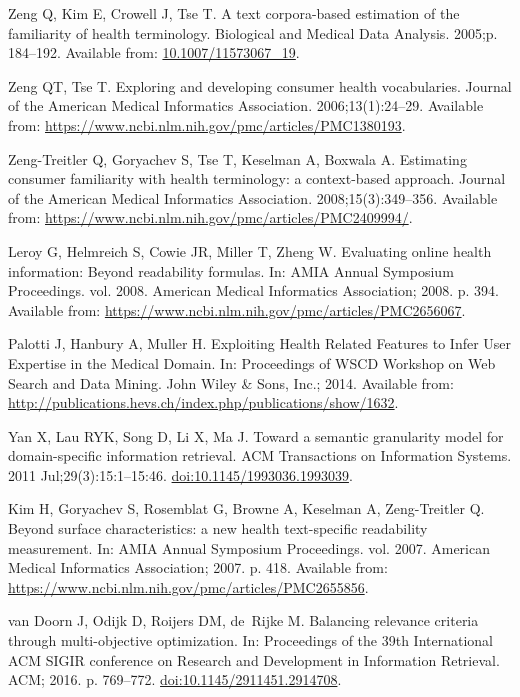 \documentclass[10pt,a4paper]{article}
\begin{document}
\begin{thebibliography}{10}
	Zeng Q, Kim E, Crowell J, Tse T.
	\newblock A text corpora-based estimation of the familiarity of health
	terminology.
	\newblock Biological and Medical Data Analysis. 2005;p. 184--192.
	\newblock Available from: \url{10.1007/11573067_19}.
	
	Zeng QT, Tse T.
	\newblock Exploring and developing consumer health vocabularies.
	\newblock Journal of the American Medical Informatics Association.
	2006;13(1):24--29.
	\newblock Available from:
	\url{https://www.ncbi.nlm.nih.gov/pmc/articles/PMC1380193}.
	
	Zeng-Treitler Q, Goryachev S, Tse T, Keselman A, Boxwala A.
	\newblock Estimating consumer familiarity with health terminology: a
	context-based approach.
	\newblock Journal of the American Medical Informatics Association.
	2008;15(3):349--356.
	\newblock Available from:
	\url{https://www.ncbi.nlm.nih.gov/pmc/articles/PMC2409994/}.
	
	Leroy G, Helmreich S, Cowie JR, Miller T, Zheng W.
	\newblock Evaluating online health information: Beyond readability formulas.
	\newblock In: AMIA Annual Symposium Proceedings. vol. 2008. American Medical
	Informatics Association; 2008. p. 394.
	\newblock Available from:
	\url{https://www.ncbi.nlm.nih.gov/pmc/articles/PMC2656067}.
	
	Palotti J, Hanbury A, Muller H.
	\newblock Exploiting Health Related Features to Infer User Expertise in the
	Medical Domain.
	\newblock In: Proceedings of WSCD Workshop on Web Search and Data Mining. John
	Wiley \& Sons, Inc.; 2014. Available from:
	\url{http://publications.hevs.ch/index.php/publications/show/1632}.
	
	Yan X, Lau RYK, Song D, Li X, Ma J.
	\newblock Toward a semantic granularity model for domain-specific information
	retrieval.
	\newblock ACM Transactions on Information Systems. 2011 Jul;29(3):15:1--15:46.
	\newblock \href {http://dx.doi.org/10.1145/1993036.1993039}
	{doi:10.1145/1993036.1993039}.
	
	Kim H, Goryachev S, Rosemblat G, Browne A, Keselman A, Zeng-Treitler Q.
	\newblock Beyond surface characteristics: a new health text-specific
	readability measurement.
	\newblock In: AMIA Annual Symposium Proceedings. vol. 2007. American Medical
	Informatics Association; 2007. p. 418.
	\newblock Available from:
	\url{https://www.ncbi.nlm.nih.gov/pmc/articles/PMC2655856}.
	
	van Doorn J, Odijk D, Roijers DM, de~Rijke M.
	\newblock Balancing relevance criteria through multi-objective optimization.
	\newblock In: Proceedings of the 39th International ACM SIGIR conference on
	Research and Development in Information Retrieval. ACM; 2016. p. 769--772.
	\newblock \href {http://dx.doi.org/10.1145/2911451.2914708}
	{doi:10.1145/2911451.2914708}.
	

\end{thebibliography}
\end{document}
